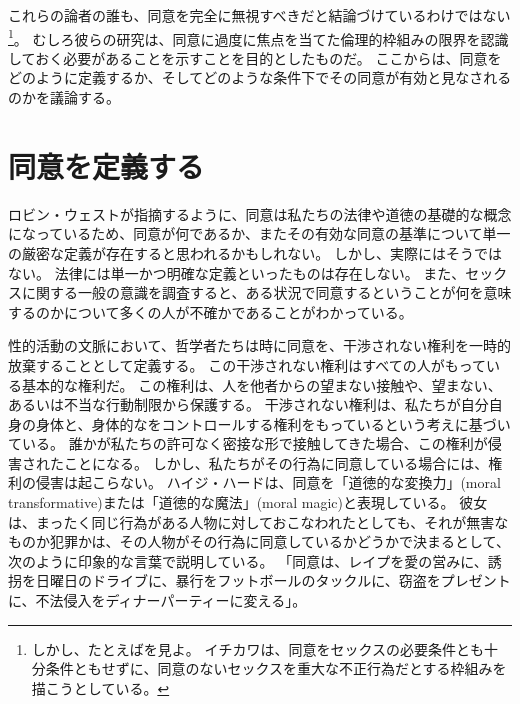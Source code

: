\documentclass[paper=a4,book,openany]{jlreq}
\newcommand{\ig}[1]{}           %
\begin{document}
これらの論者の誰も、同意を完全に無視すべきだと結論づけているわけではない\footnote{しかし、たとえば\citet{ichikawa20:_presup_consen}を見よ。
イチカワは、同意をセックスの必要条件とも十分条件ともせずに、同意のないセックスを重大な不正行為だとする枠組みを描こうとしている。
\nocite{ichikawa20:_presup_consen}}。
むしろ彼らの研究は、同意に過度に焦点を当てた倫理的枠組みの限界を認識しておく必要があることを示すことを目的としたものだ。
ここからは、同意をどのように定義するか、そしてどのような条件下でその同意が有効と見なされるのかを議論する。

\section{同意を定義する}

ロビン・ウェスト\ig{Robin West}が指摘するように、同意は私たちの法律や道徳の基礎的な概念になっているため、同意が何であるか、またその有効な同意の基準について単一の厳密な定義が存在すると思われるかもしれない。
しかし、実際にはそうではない。
法律には単一かつ明確な定義といったものは存在しない。
また、セックスに関する一般の意識を調査すると、ある状況で同意するということが何を意味するのかについて多くの人が不確かであることがわかっている\citep[pp.462-463]{muehlenhard16:_compl_sexual_consen_colleg_studen}。

性的活動の文脈において、哲学者たちは時に同意を、干渉されない権利を一時的放棄することとして定義する。
この干渉されない権利はすべての人がもっている基本的な権利だ。
この権利は、人を他者からの望まない接触や、望まない、あるいは不当な行動制限から保護する。
干渉されない権利は、私たちが自分自身の身体と、身体的なをコントロールする権利をもっているという考えに基づいている。
誰かが私たちの許可なく密接な形で接触してきた場合、この権利が侵害されたことになる。
しかし、私たちがその行為に同意している場合には、権利の侵害は起こらない。
ハイジ・ハード\ig{Hurd}は、同意を「道徳的な変換力」(moral transformative)または「道徳的な魔法」(moral magic)と表現している。
彼女は、まったく同じ行為がある人物に対しておこなわれたとしても、それが無害なものか犯罪かは、その人物がその行為に同意しているかどうかで決まるとして、
次のように印象的な言葉で説明している。
「同意は、レイプを愛の営みに、誘拐を日曜日のドライブに、暴行をフットボールのタックルに、窃盗をプレゼントに、不法侵入をディナーパーティーに変える」\citep[pp.503-504]{hurd05:_blamin_victim}。
\end{document}
